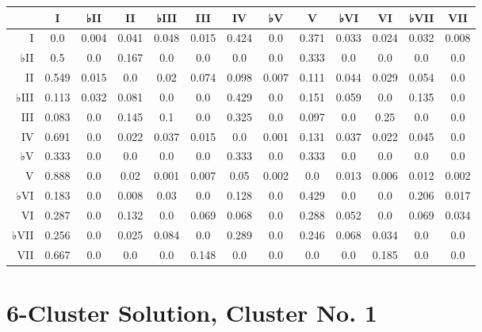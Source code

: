 \begin{table}[htbp]
\begin{minipage}{\linewidth}
\setlength{\tymax}{0.5\linewidth}
\centering
\small
\begin{tabulary}{\textwidth}{@{}RCCCCCCCCCCCC@{}} \toprule
&I&♭II&II&♭III&III&IV&♭V&V&♭VI&VI&♭VII&VII\\
\midrule
I&0.0&0.004&0.041&0.048&0.015&0.424&0.0&0.371&0.033&0.024&0.032&0.008\\
♭II&0.5&0.0&0.167&0.0&0.0&0.0&0.0&0.333&0.0&0.0&0.0&0.0\\
II&0.549&0.015&0.0&0.02&0.074&0.098&0.007&0.111&0.044&0.029&0.054&0.0\\
♭III&0.113&0.032&0.081&0.0&0.0&0.429&0.0&0.151&0.059&0.0&0.135&0.0\\
III&0.083&0.0&0.145&0.1&0.0&0.325&0.0&0.097&0.0&0.25&0.0&0.0\\
IV&0.691&0.0&0.022&0.037&0.015&0.0&0.001&0.131&0.037&0.022&0.045&0.0\\
♭V&0.333&0.0&0.0&0.0&0.0&0.333&0.0&0.333&0.0&0.0&0.0&0.0\\
V&0.888&0.0&0.02&0.001&0.007&0.05&0.002&0.0&0.013&0.006&0.012&0.002\\
♭VI&0.183&0.0&0.008&0.03&0.0&0.128&0.0&0.429&0.0&0.0&0.206&0.017\\
VI&0.287&0.0&0.132&0.0&0.069&0.068&0.0&0.288&0.052&0.0&0.069&0.034\\
♭VII&0.256&0.0&0.025&0.084&0.0&0.289&0.0&0.246&0.068&0.034&0.0&0.0\\
VII&0.667&0.0&0.0&0.0&0.148&0.0&0.0&0.0&0.0&0.185&0.0&0.0\\

\bottomrule

\end{tabulary}
\end{minipage}
\end{table}

\section{6-Cluster Solution, Cluster No. 1}
\label{6-clustersolutionclusterno.1}

